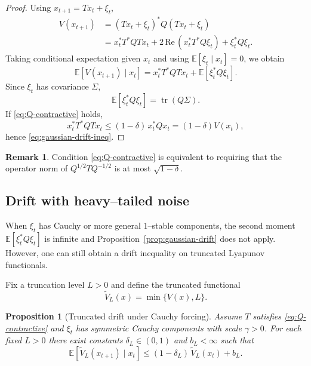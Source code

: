 \documentclass[11pt]{article}
\theoremstyle{plain}
\newtheorem{proposition}[theorem]{Proposition}
\theoremstyle{definition}
\newtheorem{remark}[theorem]{Remark}
\numberwithin{equation}{section}
\begin{document}
\begin{proof}
Using $x_{t+1} = T x_t + \xi_t$,
\begin{align*}
  V(x_{t+1})
  &= (T x_t + \xi_t)^\ast Q (T x_t + \xi_t) \\
  &= x_t^\ast T^\ast Q T x_t
   + 2\,\mathrm{Re}\,(x_t^\ast T^\ast Q \xi_t)
   + \xi_t^\ast Q \xi_t.
\end{align*}
Taking conditional expectation given $x_t$ and using
$\mathbb{E}[\xi_t \mid x_t] = 0$, we obtain
\[
  \mathbb{E}[V(x_{t+1}) \mid x_t]
  = x_t^\ast T^\ast Q T x_t + \mathbb{E}[\xi_t^\ast Q \xi_t].
\]
Since $\xi_t$ has covariance $\Sigma$,
\[
  \mathbb{E}[\xi_t^\ast Q \xi_t]
  = \operatorname{tr}(Q\Sigma).
\]
If \eqref{eq:Q-contractive} holds,
\[
  x_t^\ast T^\ast Q T x_t
  \le (1-\delta)\, x_t^\ast Q x_t
  = (1-\delta) V(x_t),
\]
hence \eqref{eq:gaussian-drift-ineq}.
\end{proof}

\begin{remark}
Condition \eqref{eq:Q-contractive} is equivalent to requiring that
the operator norm of $Q^{1/2} T Q^{-1/2}$ is at most $\sqrt{1-\delta}$.
\end{remark}

\subsection{Drift with heavy--tailed noise}

When $\xi_t$ has Cauchy or more general $1$--stable components, the
second moment $\mathbb{E}[\xi_t^\ast Q \xi_t]$ is infinite and
Proposition~\ref{prop:gaussian-drift} does not apply. However, one can
still obtain a drift inequality on truncated Lyapunov functionals.

Fix a truncation level $L>0$ and define the truncated functional
\begin{equation}
  \tilde{V}_L(x)
  = \min\{V(x), L\}.
\end{equation}

\begin{proposition}[Truncated drift under Cauchy forcing]
\label{prop:cauchy-truncated}
Assume $T$ satisfies \eqref{eq:Q-contractive} and $\xi_t$ has symmetric
Cauchy components with scale $\gamma>0$. For each fixed $L>0$ there
exist constants $\delta_L \in (0,1)$ and $b_L < \infty$ such that
\begin{equation}
  \mathbb{E}[\tilde{V}_L(x_{t+1}) \mid x_t]
  \le (1-\delta_L)\, \tilde{V}_L(x_t) + b_L.
  \label{eq:truncated-drift}
\end{equation}
\end{proposition}
\end{document}
